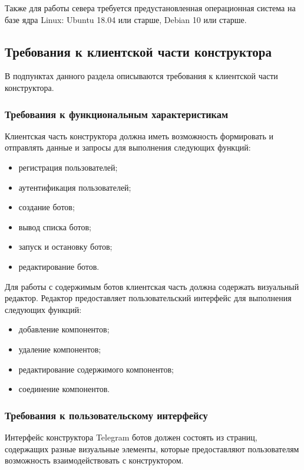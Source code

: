 Также для работы севера требуется предустановленная операционная
система на базе ядра Linux: Ubuntu 18.04 или старше, Debian 10 или старше.

\subsection{Требования к клиентской части конструктора}

В подпунктах данного раздела описываются требования к клиентской части конструктора.


\subsubsection{Требования к функциональным характеристикам}

Клиентская часть конструктора должна иметь возможность
формировать и отправлять данные и запросы для выполнения следующих
функций:
\begin{itemize}
	\item регистрация пользователей;
	\item аутентификация пользователей;
	\item создание ботов;
	\item вывод списка ботов;
	\item запуск и остановку ботов;
	\item редактирование ботов.
\end{itemize}

Для работы с содержимым ботов клиентская часть должна содержать
визуальный редактор. Редактор предоставляет пользовательский интерфейс
для выполнения следующих функций:
\begin{itemize}
	\item добавление компонентов;
	\item удаление компонентов;
	\item редактирование содержимого компонентов;
	\item соединение компонентов.
\end{itemize}


\subsubsection{Требования к пользовательскому интерфейсу}

Интерфейс конструктора Telegram ботов должен состоять из страниц,
содержащих разные визуальные элементы, которые предоставляют
пользователям возможность взаимодействовать с конструктором.

